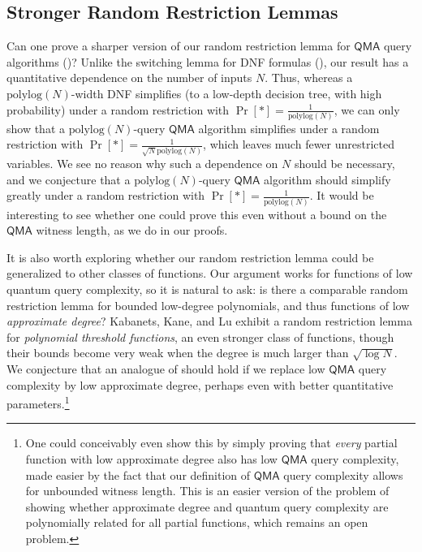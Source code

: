 \documentclass[10pt,a4paper]{article}
\newcommand{\polylog}{\mathrm{polylog}}
\begin{document}
\subsection{Stronger Random Restriction Lemmas}
Can one prove a sharper version of our random restriction lemma for $\mathsf{QMA}$ query algorithms ()? Unlike the switching lemma for DNF formulas (), our result has a quantitative dependence on the number of inputs $N$. Thus, whereas a $\polylog(N)$-width DNF simplifies (to a low-depth decision tree, with high probability) under a random restriction with $\Pr[*] = \frac{1}{\polylog(N)}$, we can only show that a $\polylog(N)$-query $\mathsf{QMA}$ algorithm simplifies under a random restriction with $\Pr[*] = \frac{1}{\sqrt{N}\polylog(N)}$, which leaves much fewer unrestricted variables. We see no reason why such a dependence on $N$ should be necessary, and we conjecture that a $\polylog(N)$-query $\mathsf{QMA}$ algorithm should simplify greatly under a random restriction with $\Pr[*] = \frac{1}{\polylog(N)}$. It would be interesting to see whether one could prove this even without a bound on the $\mathsf{QMA}$ witness length, as we do in our proofs.

It is also worth exploring whether our random restriction lemma could be generalized to other classes of functions. Our argument works for functions of low quantum query complexity, so it is natural to ask: is there a comparable random restriction lemma for bounded low-degree polynomials, and thus functions of low \textit{approximate degree}? Kabanets, Kane, and Lu \cite{KKL17} exhibit a random restriction lemma for \textit{polynomial threshold functions}, an even stronger class of functions, though their bounds become very weak when the degree is much larger than $\sqrt{\log N}$. We conjecture that an analogue of  should hold if we replace low $\mathsf{QMA}$ query complexity by low approximate degree, perhaps even with better quantitative parameters.\footnote{One could conceivably even show this by simply proving that \textit{every} partial function with low approximate degree also has low $\mathsf{QMA}$ query complexity, made easier by the fact that our definition of $\mathsf{QMA}$ query complexity allows for unbounded witness length. This is an easier version of the problem of showing whether approximate degree and quantum query complexity are polynomially related for all partial functions, which remains an open problem.}
\end{document}
